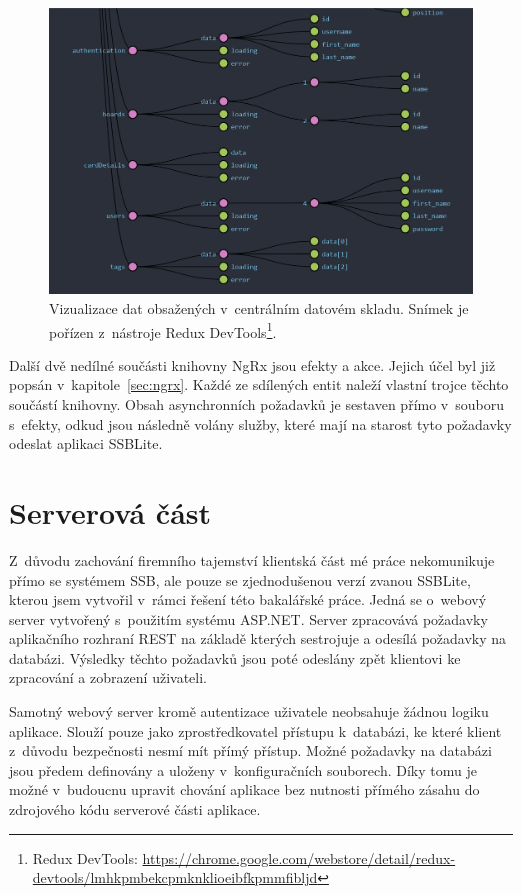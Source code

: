 \begin{figure}[H]
	\centering
	\label{img:ngrx-devtools}
	\includegraphics[width=\textwidth]{obrazky-figures/ngrx-chart.png}
	\caption{Vizualizace dat obsažených v~centrálním datovém skladu. Snímek je pořízen z~nástroje Redux DevTools\footnote{Redux DevTools: \url{https://chrome.google.com/webstore/detail/redux-devtools/lmhkpmbekcpmknklioeibfkpmmfibljd}}.}
\end{figure}

Další dvě nedílné součásti knihovny NgRx jsou efekty a akce. Jejich účel byl již popsán v~kapitole~\ref{sec:ngrx}. Každé ze sdílených entit naleží vlastní trojce těchto součástí knihovny. Obsah asynchronních požadavků je sestaven přímo v~souboru s~efekty, odkud jsou následně volány služby, které mají na starost tyto požadavky odeslat aplikaci SSBLite.



\section{Serverová část}
Z~důvodu zachování firemního tajemství klientská část mé práce nekomunikuje přímo se systémem SSB, ale pouze se zjednodušenou verzí zvanou SSBLite, kterou jsem vytvořil v~rámci řešení této bakalářské práce. Jedná se o~webový server vytvořený s~použitím systému ASP.NET. Server zpracovává požadavky aplikačního rozhraní REST na základě kterých sestrojuje a odesílá požadavky na databázi. Výsledky těchto požadavků jsou poté odeslány zpět klientovi ke zpracování a zobrazení uživateli.

Samotný webový server kromě autentizace uživatele neobsahuje žádnou logiku aplikace. Slouží pouze jako zprostředkovatel přístupu k~databázi, ke které klient z~důvodu bezpečnosti nesmí mít přímý přístup. Možné požadavky na databázi jsou předem definovány a uloženy v~konfiguračních souborech. Díky tomu je možné v~budoucnu upravit chování aplikace bez nutnosti přímého zásahu do zdrojového kódu serverové části aplikace. 


